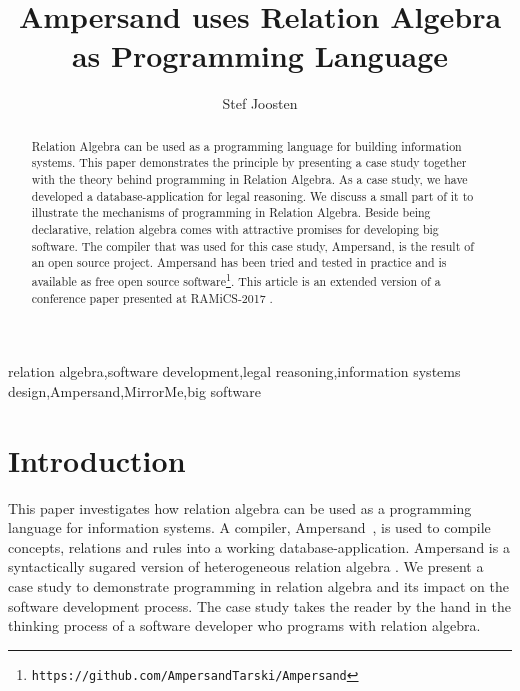 \documentclass{elsarticle}
\begin{document}
\title{Ampersand uses Relation Algebra as Programming Language}
\author[ou,ordina]{Stef Joosten}
\address[ou]{Open Universiteit Nederland, Postbus 2960, 6401 DL Heerlen, the Netherlands}
\address[ordina]{Ordina NV,  Nieuwegein, the Netherlands}

\begin{abstract}
	Relation Algebra can be used as a programming language for building information systems.
	This paper demonstrates the principle by presenting a case study together with the theory behind programming in Relation Algebra.
	As a case study, we have developed a database-application for legal reasoning.
	We discuss a small part of it to illustrate the mechanisms of programming in Relation Algebra.
	Beside being declarative, relation algebra comes with attractive promises for developing big software.
	The compiler that was used for this case study, Ampersand, is the result of an open source project.
	Ampersand has been tried and tested in practice and is available as free open source software\footnote{\tt https://github.com/AmpersandTarski/Ampersand}.
	This article is an extended version of a conference paper presented at RAMiCS-2017 \cite{JoostenRAMiCS2017}.
\end{abstract}

\begin{keyword}
relation algebra\sep software development\sep legal reasoning\sep information systems design\sep Ampersand\sep MirrorMe\sep big software
\end{keyword}
\maketitle

\section{Introduction}
\label{sct:Introduction}
	This paper investigates how relation algebra can be used as a programming language for information systems.
	A compiler, Ampersand~\cite{Michels2011}, is used to compile concepts, relations and rules into a working database-application.
	Ampersand is a syntactically sugared version of heterogeneous relation algebra \cite{Schmidt1997}.
	We present a case study to demonstrate programming in relation algebra and its impact on the software development process.
	The case study takes the reader by the hand in the thinking process of a software developer who programs with relation algebra.
\end{document}
